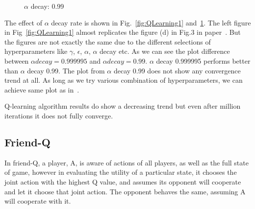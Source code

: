 \documentclass[conference]{IEEEtran}
\begin{document}
\begin{figure}[htbp]
\centering
{}%
%
\centering
\caption{$\alpha$ decay: 0.99}
\label{fig:QLearning2}
\end{figure}

The effect of $\alpha$ decay rate is shown in Fig.~\ref{fig:QLearning1} and~\ref{fig:QLearning2}. The left figure in Fig~\ref{fig:QLearning1} almost replicates the figure (d) in Fig.3 in paper~\cite{b1}. But the figures are not exactly the same due to the different selections of hyperparameters like $\gamma$, $\epsilon$, $\alpha$, $\alpha$ decay etc. As we can see the plot difference between $\alpha decay = 0.999995$ and $\alpha decay = 0.99$. $\alpha$ decay 0.999995 performs better than $\alpha$ decay 0.99. The plot from $\alpha$ decay 0.99 does not show any convergence trend at all. As long as we try various combination of{} hyperparameters, we can achieve same plot as in~\cite{b1}.

Q-learning algorithm results do show a decreasing trend but even after million iterations it does not fully converge.

\subsection{Friend-Q}

In friend-Q, a player, A, is aware of actions of all players, as well as the full state of game, however in evaluating the utility of a particular state, it chooses the joint action with the highest Q value, and assumes its opponent will cooperate and let it choose that joint action. The opponent behaves the same, assuming A will cooperate with it.
\end{document}
